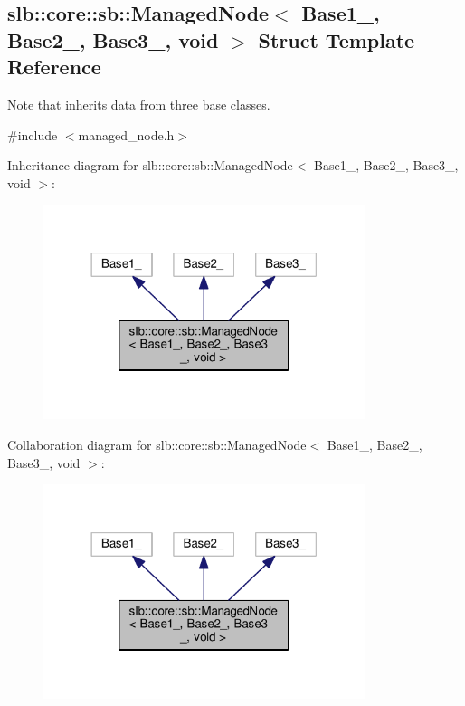 \hypertarget{structslb_1_1core_1_1sb_1_1ManagedNode_3_01Base1___00_01Base2___00_01Base3___00_01void_01_4}{}\subsection{slb\+:\+:core\+:\+:sb\+:\+:Managed\+Node$<$ Base1\+\_\+, Base2\+\_\+, Base3\+\_\+, void $>$ Struct Template Reference}
\label{structslb_1_1core_1_1sb_1_1ManagedNode_3_01Base1___00_01Base2___00_01Base3___00_01void_01_4}


Note that inherits data from three base classes.  




{\ttfamily \#include $<$managed\+\_\+node.\+h$>$}



Inheritance diagram for slb\+:\+:core\+:\+:sb\+:\+:Managed\+Node$<$ Base1\+\_\+, Base2\+\_\+, Base3\+\_\+, void $>$\+:\nopagebreak
\begin{figure}[H]
\begin{center}
\leavevmode
\includegraphics[width=266pt]{structslb_1_1core_1_1sb_1_1ManagedNode_3_01Base1___00_01Base2___00_01Base3___00_01void_01_4__inherit__graph}
\end{center}
\end{figure}


Collaboration diagram for slb\+:\+:core\+:\+:sb\+:\+:Managed\+Node$<$ Base1\+\_\+, Base2\+\_\+, Base3\+\_\+, void $>$\+:\nopagebreak
\begin{figure}[H]
\begin{center}
\leavevmode
\includegraphics[width=266pt]{structslb_1_1core_1_1sb_1_1ManagedNode_3_01Base1___00_01Base2___00_01Base3___00_01void_01_4__coll__graph}
\end{center}
\end{figure}

